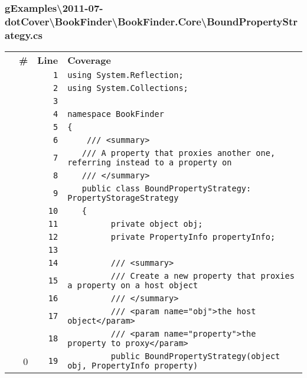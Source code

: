 \documentclass[a4paper,10pt]{article}
\begin{document}
\subsubsection{gExamples\textbackslash 2011-07-dotCover\textbackslash BookFinder\textbackslash BookFinder.Core\textbackslash BoundPropertyStrategy.cs}
\begin{longtable}[l]{lrrl}
\textbf{} & \textbf{\#} & \textbf{Line} & \textbf{Coverage}\\
\cellcolor{gray} &  & \verb~1~ & \verb~using System.Reflection;~\\
\cellcolor{gray} &  & \verb~2~ & \verb~using System.Collections;~\\
\cellcolor{gray} &  & \verb~3~ & \verb~~\\
\cellcolor{gray} &  & \verb~4~ & \verb~namespace BookFinder~\\
\cellcolor{gray} &  & \verb~5~ & \verb~{~\\
\cellcolor{gray} &  & \verb~6~ & \verb~    /// <summary>~\\
\cellcolor{gray} &  & \verb~7~ & \verb~   /// A property that proxies another one, referring instead to a property on~\\
\cellcolor{gray} &  & \verb~8~ & \verb~   /// </summary>~\\
\cellcolor{gray} &  & \verb~9~ & \verb~   public class BoundPropertyStrategy: PropertyStorageStrategy~\\
\cellcolor{gray} &  & \verb~10~ & \verb~   {~\\
\cellcolor{gray} &  & \verb~11~ & \verb~         private object obj;~\\
\cellcolor{gray} &  & \verb~12~ & \verb~         private PropertyInfo propertyInfo;~\\
\cellcolor{gray} &  & \verb~13~ & \verb~~\\
\cellcolor{gray} &  & \verb~14~ & \verb~         /// <summary>~\\
\cellcolor{gray} &  & \verb~15~ & \verb~         /// Create a new property that proxies a property on a host object~\\
\cellcolor{gray} &  & \verb~16~ & \verb~         /// </summary>~\\
\cellcolor{gray} &  & \verb~17~ & \verb~         /// <param name="obj">the host object</param>~\\
\cellcolor{gray} &  & \verb~18~ & \verb~         /// <param name="property">the property to proxy</param>~\\
\cellcolor{red} & 0 & \verb~19~ & \verb~         public BoundPropertyStrategy(object obj, PropertyInfo property)~\\

\end{longtable}
\end{document}
